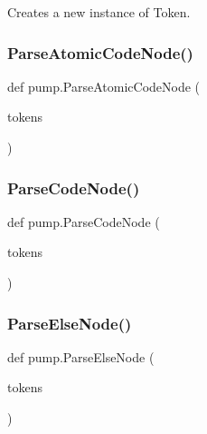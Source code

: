 \begin{DoxyVerb}Creates a new instance of Token.\end{DoxyVerb}
 \mbox{\label{namespacepump_a5532710f334f026f80fc485decf5078e}} 
\subsubsection{\texorpdfstring{Parse\+Atomic\+Code\+Node()}{ParseAtomicCodeNode()}}
{\footnotesize\ttfamily def pump.\+Parse\+Atomic\+Code\+Node (\begin{DoxyParamCaption}\item[{}]{tokens }\end{DoxyParamCaption})}

\mbox{\label{namespacepump_aabbc064b8664abbe05618b3a0f5a6c38}} 
\subsubsection{\texorpdfstring{Parse\+Code\+Node()}{ParseCodeNode()}}
{\footnotesize\ttfamily def pump.\+Parse\+Code\+Node (\begin{DoxyParamCaption}\item[{}]{tokens }\end{DoxyParamCaption})}

\mbox{\label{namespacepump_ae40493525a993e81929c6905e329a406}} 
\subsubsection{\texorpdfstring{Parse\+Else\+Node()}{ParseElseNode()}}
{\footnotesize\ttfamily def pump.\+Parse\+Else\+Node (\begin{DoxyParamCaption}\item[{}]{tokens }\end{DoxyParamCaption})}

\mbox{\label{namespacepump_af62b08489d90e69d0577e82c98383ba7}} 
